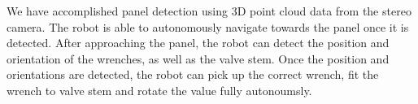 

We have accomplished panel detection using 3D point cloud data
from the stereo camera. The robot is able to autonomously navigate
towards the panel once it is detected. After approaching the panel,
the robot can detect the position and orientation of the wrenches, as
well as the valve stem. Once the position and orientations are
detected, the robot can pick up the correct wrench, fit the wrench to
valve stem and rotate the value fully autonoumsly. 



